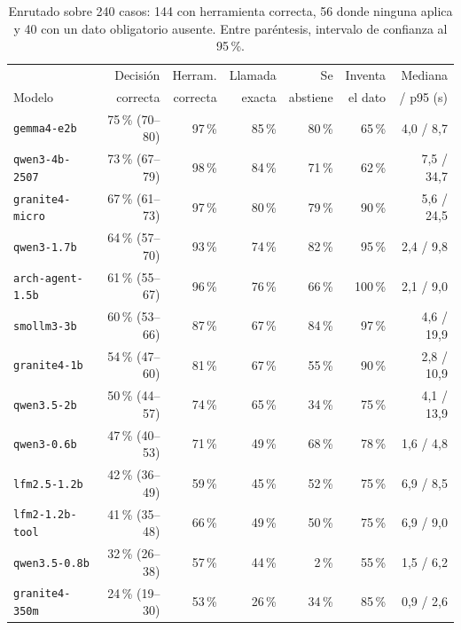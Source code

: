 \documentclass[11pt,a4paper]{article}
\newcommand{\m}[1]{\texttt{#1}}
\begin{document}
\begin{table}[H]
\centering\small
\caption{Enrutado sobre 240 casos: 144 con herramienta correcta, 56 donde ninguna aplica y 40 con un dato obligatorio ausente. Entre paréntesis, intervalo de confianza al 95\,\%.}\label{tab:fc}
\begin{tabularx}{\textwidth}{@{}lrRRRRR@{}}
\toprule
 & Decisión & Herram. & Llamada & Se & Inventa & Mediana\\
Modelo & correcta & correcta & exacta & abstiene & el dato & / p95 (s)\\
\midrule
\m{gemma4-e2b} & 75\,\% (70--80) & 97\,\% & 85\,\% & 80\,\% & 65\,\% & 4,0 / 8,7\\
\m{qwen3-4b-2507} & 73\,\% (67--79) & 98\,\% & 84\,\% & 71\,\% & 62\,\% & 7,5 / 34,7\\
\m{granite4-micro} & 67\,\% (61--73) & 97\,\% & 80\,\% & 79\,\% & 90\,\% & 5,6 / 24,5\\
\m{qwen3-1.7b} & 64\,\% (57--70) & 93\,\% & 74\,\% & 82\,\% & 95\,\% & 2,4 / 9,8\\
\m{arch-agent-1.5b} & 61\,\% (55--67) & 96\,\% & 76\,\% & 66\,\% & 100\,\% & 2,1 / 9,0\\
\m{smollm3-3b} & 60\,\% (53--66) & 87\,\% & 67\,\% & 84\,\% & 97\,\% & 4,6 / 19,9\\
\m{granite4-1b} & 54\,\% (47--60) & 81\,\% & 67\,\% & 55\,\% & 90\,\% & 2,8 / 10,9\\
\m{qwen3.5-2b} & 50\,\% (44--57) & 74\,\% & 65\,\% & 34\,\% & 75\,\% & 4,1 / 13,9\\
\m{qwen3-0.6b} & 47\,\% (40--53) & 71\,\% & 49\,\% & 68\,\% & 78\,\% & 1,6 / 4,8\\
\m{lfm2.5-1.2b} & 42\,\% (36--49) & 59\,\% & 45\,\% & 52\,\% & 75\,\% & 6,9 / 8,5\\
\m{lfm2-1.2b-tool} & 41\,\% (35--48) & 66\,\% & 49\,\% & 50\,\% & 75\,\% & 6,9 / 9,0\\
\m{qwen3.5-0.8b} & 32\,\% (26--38) & 57\,\% & 44\,\% & 2\,\% & 55\,\% & 1,5 / 6,2\\
\m{granite4-350m} & 24\,\% (19--30) & 53\,\% & 26\,\% & 34\,\% & 85\,\% & 0,9 / 2,6\\
\bottomrule
\end{tabularx}
\end{table}
\end{document}
